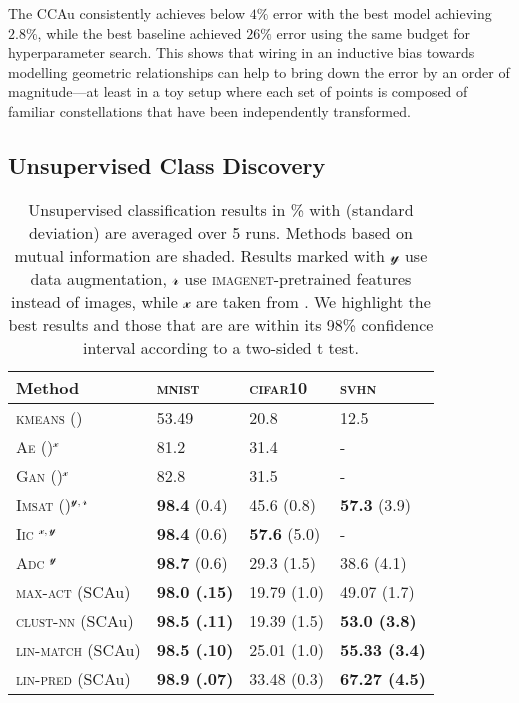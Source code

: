 The \gls{CCAu} consistently achieves below $4\%$ error with the best model achieving $2.8\%$, while the best baseline achieved $26\%$ error using the same budget for hyperparameter search.
This shows that wiring in an inductive bias towards modelling geometric relationships can help to bring down the error by an order of magnitude—at least in a toy setup where each set of points is composed of familiar constellations that have been independently transformed.

\subsection{Unsupervised Class Discovery}
\label{sec:cls_experiments}

\begin{table}
\centering
    \caption{
        Unsupervised classification results in \% with (standard deviation) are averaged over 5 runs. Methods based on mutual information are shaded. Results marked with $\mathcal{y}$ use data augmentation, ${\mathcal{r}}$ use \textsc{imagenet}-pretrained features instead of images, while ${\mathcal{x}}$ are taken from \cite{Ji2018iic}. We highlight the best results and those that are are within its 98\% confidence interval according to a two-sided t test.
    }
    \label{tab:results}
    {\small
    \begin{tabular}{@{}llll@{}}
        Method & \textsc{mnist} & \textsc{cifar10} & \textsc{svhn} \\
        \midrule
        \textsc{kmeans} (\cite{Haeusser2018adc}) & 53.49 & 20.8 & 12.5 \\
        \textsc{Ae} (\cite{Bengio2007greedy})$^{\mathcal{x}}$ & 81.2 & 31.4 & - \\
        \textsc{Gan} (\cite{Radford2016gan})$^{\mathcal{x}}$ & 82.8 & 31.5 & - \\
        \rowcolor[HTML]{EFEFEF} 
        \textsc{Imsat} (\cite{Hu2017imsat})$^{\mathcal{y}, \mathcal{r}}$ & \textbf{98.4} (0.4) & 45.6 (0.8) & \textbf{57.3} (3.9) \\ 
        \rowcolor[HTML]{EFEFEF} 
        \textsc{Iic} \citep{Ji2018iic}$^{\mathcal{x}, \mathcal{y}}$ & \textbf{98.4} (0.6) & \textbf{57.6} (5.0) & - \\
        \rowcolor[HTML]{EFEFEF} 
        \textsc{Adc} \citep{Haeusser2018adc}$^\mathcal{y}$ & \textbf{98.7} (0.6) & 29.3 (1.5) & 38.6 (4.1) \\
        \midrule
        \textsc{max-act} (\gls{SCAu}) & \textbf{98.0 (.15)}  & 19.79 (1.0) & 49.07 (1.7) \\ 
        \textsc{clust-nn} (\gls{SCAu}) & \textbf{98.5 (.11)} & 19.39 (1.5) & \textbf{53.0 (3.8)}\\ 
        \textsc{lin-match} (\gls{SCAu}) & \textbf{98.5 (.10)} & 25.01 (1.0) & \textbf{55.33 (3.4)} \\ 
        \textsc{lin-pred} (\gls{SCAu}) & \textbf{98.9 (.07)} & 33.48 (0.3) & \textbf{67.27 (4.5)} \\
    \end{tabular}
	}
\end{table}
